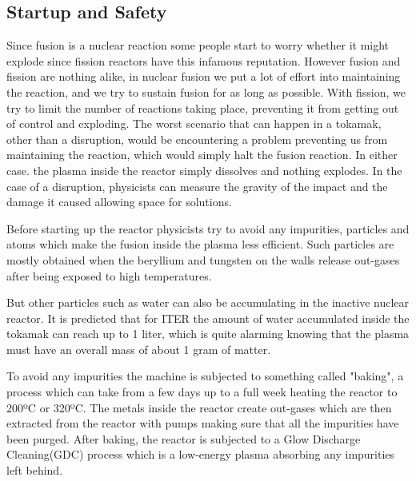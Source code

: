 \documentclass[11pt, openright]{book}
\begin{document}
\subsection{Startup and Safety}

\tab Since fusion is a nuclear reaction some people start to worry whether it might explode since fission reactors have this infamous reputation. However fusion and fission are nothing alike, in nuclear fusion we put a lot of effort into maintaining the reaction, and we try to sustain fusion for as long as possible. With fission, we try to limit the number of reactions taking place, preventing it from getting out of control and exploding. The worst scenario that can happen in a tokamak, other than a disruption, would be encountering a problem preventing us from maintaining the reaction, which would simply halt the fusion reaction. In either case. the plasma inside the reactor simply dissolves and nothing explodes. In the case of a disruption, physicists can measure the gravity of the impact and the damage it caused allowing space for solutions.

\tab Before starting up the reactor physicists try to avoid any impurities, particles and atoms which make the fusion inside the plasma less efficient. Such particles are mostly obtained when the beryllium and tungsten on the walls release out-gases after being exposed to high temperatures.

\tab But other particles such as water can also be accumulating in the inactive nuclear reactor. It is predicted that for ITER the amount of water accumulated inside the tokamak can reach up to 1 liter, which is quite alarming knowing that the plasma must have an overall mass of about 1 gram of matter.

\tab To avoid any impurities the machine is subjected to something called "baking", a process which can take from a few days up to a full week heating the reactor to 200ºC or 320ºC. The metals inside the reactor create out-gases which are then extracted from the reactor with pumps making sure that all the impurities have been purged. After baking, the reactor is subjected to a Glow Discharge Cleaning(GDC) process which is a low-energy plasma absorbing any impurities left behind.
\end{document}
